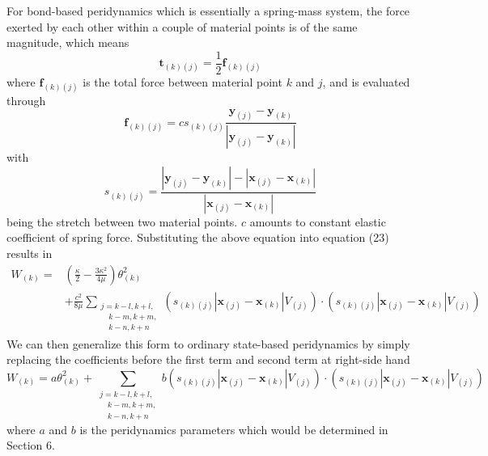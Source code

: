 \documentclass[a4paper,11pt,CJK]{paper}
\newcommand{\bfxj}{\textbf{x}_{(j)}}
\newcommand{\bfyj}{\textbf{y}_{(j)}}
\newcommand{\bfxk}{\textbf{x}_{(k)}}
\newcommand{\bfyk}{\textbf{y}_{(k)}}
\newcommand{\skj}{s_{(k)(j)}}
\newcommand{\fkj}{\textbf{f}_{(k)(j)}}
\newcommand{\tkj}{\textbf{t}_{(k)(j)}}
\newcommand{\thetak}{\theta_{(k)}}
\begin{document}
For bond-based peridynamics which is essentially a spring-mass system, the force exerted by each other within a couple of material points is of the same magnitude, which means 
\begin{equation}
\tkj =  \frac{1}{2}\fkj
\end{equation}
where $\fkj$ is the total force between material point $k$ and $j$, and is evaluated through
\begin{equation}
\fkj = c\skj\frac{\bfyj - \bfyk}{|\bfyj - \bfyk|}
\end{equation}
with
\begin{equation}
\skj = \frac{|\bfyj - \bfyk| - |\bfxj - \bfxk|}{|\bfxj - \bfxk|}
\end{equation}
being the stretch between two material points. $c$ amounts to constant elastic coefficient of spring force. Substituting the above equation into equation (23) results in
\begin{equation}
\begin{aligned}
W_{(k)} =& (\frac{\kappa}{2} -\frac{3\kappa^2}{4\mu})\thetak^2 \\
         &+\frac{c^2}{8\mu}\sum_{\substack {j=k-l,k+l,\\ \quad k-m,k+m,\\ \quad k-n,k+n}}(\skj|\bfxj-\bfxk|V_{(j)})\cdot(\skj|\bfxj-\bfxk|V_{(j)})
\end{aligned}
\end{equation}
We can then generalize this form to ordinary state-based peridynamics by simply replacing the coefficients before the first term and second term at right-side hand
\begin{equation}
W_{(k)} = a\thetak^2
          +\sum_{\substack {j=k-l,k+l,\\ \quad k-m,k+m,\\ \quad k-n,k+n}}b(\skj|\bfxj-\bfxk|V_{(j)})\cdot(\skj|\bfxj-\bfxk|V_{(j)})
\end{equation}
where $a$ and $b$ is the peridynamics parameters which would be determined in Section 6.
\end{document}
